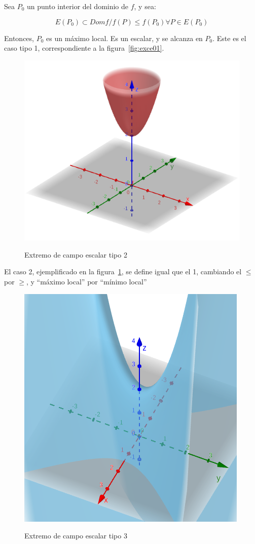 \documentclass{article}
\begin{document}
Sea $P_0$ un punto interior del dominio de $f$, y sea:

\begin{equation}
E(P_0) \subset Dom f / f(P) \leq f(P_0) \forall P \in E(P_0)
\end{equation}

Entonces, $P_0$ es un máximo local. Es un escalar, y se alcanza en $P_0$. Este es el caso tipo 1, correspondiente a la figura~\ref{fig:exce01}. 

\begin{figure}[ht]
\caption{Extremo de campo escalar tipo 2}
\includegraphics[scale=0.6]{img/teo_fig010_exce02.png} 
\centering
\label{fig:exce02}
\end{figure}

El caso 2, ejemplificado en la figura~\ref{fig:exce02}, se define igual que el 1, cambiando el $\leq$ por $\geq$, y ``máximo local'' por ``mínimo local''

\begin{figure}[ht]
\caption{Extremo de campo escalar tipo 3}
\includegraphics[scale=0.6]{img/teo_fig010_exce03.png} 
\centering
\label{fig:exce03}
\end{figure}
\end{document}
